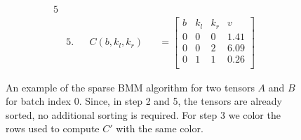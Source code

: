 \begin{figure}[H]
\begin{alignat*}{5}
        \\
         & 5.          &              & C(b, k_l, k_r) &                                                                                      & = \begin{bmatrix}
                                                                                                                                                      b & k_l & k_r & v    \\
                                                                                                                                                      0 & 0   & 0   & 1.41 \\
                                                                                                                                                      0 & 0   & 2   & 6.09 \\
                                                                                                                                                      0 & 1   & 1   & 0.26 \\
                                                                                                                                                  \end{bmatrix}
    \end{alignat*}
    \caption{An example of the sparse BMM algorithm for two tensors $A$ and $B$ for batch index $0$.
        Since, in step 2 and 5, the tensors are already sorted, no additional sorting is required. For step 3
        we color the rows used to compute $C'$ with the same color.}
    \label{fig:bmm:algorithm}
\end{figure}

